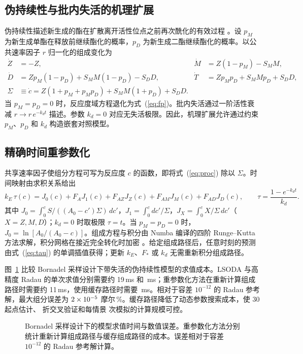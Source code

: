 \subsection{伪持续性与批内失活的机理扩展}
伪持续性描述新生成的酯在扩散离开活性位点之前再次酰化的有效过程 \cite{mitchell2023}。设 $p_M$ 为新生成单酯在释放前继续酯化的概率，$p_D$ 为新生成二酯继续酯化的概率。以公共速率因子 $r$ 归一化的组成变化为
\begin{align}
\dot Z&=-Z, & \dot M&=Z(1-p_M)-S_MM,\nonumber\\
\dot D&=Zp_M(1-p_D)+S_MM(1-p_D)-S_DD, & \dot T&=Zp_Mp_D+S_MMp_D+S_DD,\nonumber\\
\Sigma&\equiv\dot c=Z(1+p_M+p_Mp_D)+S_MM(1+p_D)+S_DD.\label{eq:proc}
\end{align}
当 $p_M=p_D=0$ 时，反应度域方程退化为式~(\ref{eq:fp})。批内失活通过一阶活性衰减 $r\to r\,e^{-k_dt}$ 描述。参数 $k_d=0$ 对应无失活极限。因此，机理扩展允许通过约束 $p_M$、$p_D$ 和 $k_d$ 构造嵌套对照模型。

\subsection{精确时间重参数化}
共享速率因子使组分方程可写为反应度 $c$ 的函数，即将式~(\ref{eq:proc}) 除以 $\Sigma$。时间映射由求积关系给出
\begin{equation}
k_E\,\tau(c)=J_0(c)+F_AJ_1(c)+F_{AZ}J_Z(c)+F_{AM}J_M(c)+F_{AD}J_D(c),\qquad \tau=\frac{1-e^{-k_dt}}{k_d}.\label{eq:tau}
\end{equation}
其中 $J_0=\int_0^c S/((A_0-c')\Sigma)\,dc'$，$J_1=\int_0^c dc'/\Sigma$，$J_X=\int_0^c X/\Sigma\,dc'$（$X=Z,M,D$）；$k_d=0$ 时取极限 $\tau=t$。当 $p_M=p_D=0$ 时，$J_0=\ln[A_0/(A_0-c)]$。组成方程与积分由 Numba 编译的四阶 Runge--Kutta 方法求解，积分网格在接近完全转化时加密 \cite{lam2015}。给定组成路径后，任意时刻的预测由式~(\ref{eq:tau}) 的单调插值获得；更新 $k_E$、$F_\ast$ 或 $k_d$ 无需重新积分组成路径。

图~\ref{fig:bench} 比较 Bornadel 采样设计下带失活的伪持续性模型的求值成本。LSODA 与高精度 Radau 的单次求值分别需要约 19\,ms 和 \SolverRadauMs\,ms；重参数化方法在重新计算组成路径时需要约 11\,ms，使用缓存路径时需要 \SolverCachedMs\,ms。相对于容差 $10^{-12}$ 的 Radau 参考解，最大组分误差为 $2\times10^{-5}$ 摩尔\,\%。缓存路径降低了动态参数搜索成本，使 30 起点估计、\NLotoFolds{} 折交叉验证和每情景 \NSimReps{} 次模拟的计算规模可控。
\begin{figure}[!htbp]\centering{}\caption{Bornadel 采样设计下的模型求值时间与数值误差。重参数化方法分别统计重新计算组成路径与缓存组成路径的成本。误差相对于容差 $10^{-12}$ 的 Radau 参考解计算。}\label{fig:bench}\end{figure}

